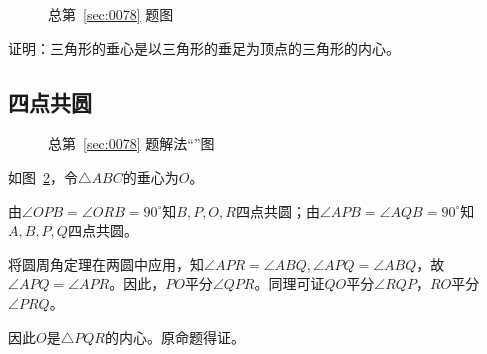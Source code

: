 

\begin{figure}[htbp]
  \centering
  \caption{总第~\ref{sec:0078} 题图} \label{fig:0078}
\end{figure}

证明：三角形的垂心是以三角形的垂足为顶点的三角形的内心。

\subsection{四点共圆} \label{subsec:0078-circ}

\begin{figure}[htbp]
  \centering
  \caption{总第~\ref{sec:0078} 题解法“”图}
  \label{fig:0078-circ}
\end{figure}

如图~\ref{fig:0078-circ}，令$\triangle ABC$的垂心为$O$。

由$\angle OPB = \angle ORB = 90^\circ$知$B, P, O, R$四点共圆；由$\angle APB = \angle AQB = 90^\circ$知$A, B, P, Q$四点共圆。

将圆周角定理在两圆中应用，知$\angle APR = \angle ABQ, \angle APQ = \angle ABQ$，故$\angle APQ = \angle APR$。因此，$PO$平分$\angle QPR$。同理可证$QO$平分$\angle RQP$，$RO$平分$\angle PRQ$。

因此$O$是$\triangle PQR$的内心。原命题得证。
